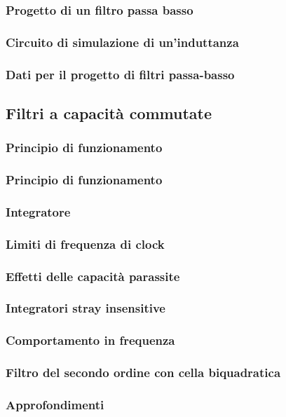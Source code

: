\documentclass[../main.tex]{subfiles}
\begin{document}
\subsubsection{Progetto di un filtro passa basso}
\subsubsection{Circuito di simulazione di un’induttanza}
\subsubsection{Dati per il progetto di filtri passa-basso}

\subsection{Filtri a capacità commutate}
\subsubsection{Principio di funzionamento}
\subsubsection{Principio di funzionamento}
\subsubsection{Integratore}
\subsubsection{Limiti di frequenza di clock}
\subsubsection{Effetti delle capacità parassite}
\subsubsection{Integratori stray insensitive}
\subsubsection{Comportamento in frequenza}
\subsubsection{Filtro del secondo ordine con cella biquadratica}
\subsubsection{Approfondimenti}
\end{document}
